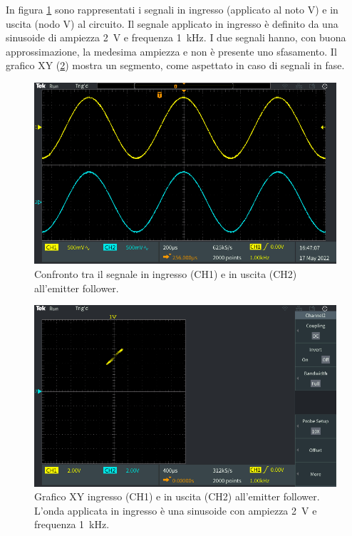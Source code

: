 \noindent
In figura \ref{fig:emitterfollwer_v2_AC} sono rappresentati i segnali in ingresso (applicato al noto V) e in uscita (nodo V) al circuito. Il segnale applicato in ingresso è definito da una sinusoide di ampiezza \SI{2}{\volt} e frequenza \SI{1}{\kilo\hertz}. I due segnali hanno, con buona approssimazione, la medesima ampiezza e non è presente uno sfasamento. Il grafico XY (\Fig\ref{fig:emitterfollwer_v2_XY}) mostra un segmento, come aspettato in caso di segnali in fase.
\begin{figure}[h!]
	\centering
	\includegraphics[width=0.8\linewidth]{./ImageFiles/Laboratorio 2/TEK00023}
	\caption{Confronto tra il segnale in ingresso (CH1) e in uscita (CH2) all'emitter follower.}
	\label{fig:emitterfollwer_v2_AC}
\end{figure}
\begin{figure}[h!]
	\centering
	\includegraphics[width=0.8\linewidth]{./ImageFiles/Laboratorio 3/TEK00001}
	\caption{Grafico XY ingresso (CH1) e in uscita (CH2) all'emitter follower. L'onda applicata in ingresso è una sinusoide con ampiezza \SI{2}{\volt} e frequenza \SI{1}{\kilo\hertz}.}
	\label{fig:emitterfollwer_v2_XY}
\end{figure}
